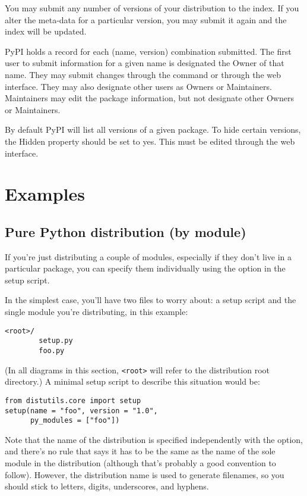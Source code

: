 \documentclass{howto}
\begin{document}
You may submit any number of versions of your distribution to the index. If
you alter the meta-data for a particular version, you may submit it again
and the index will be updated.

PyPI holds a record for each (name, version) combination submitted. The
first user to submit information for a given name is designated the Owner
of that name. They may submit changes through the 
command or through the web interface. They may also designate other users
as Owners or Maintainers. Maintainers may edit the package information, but
not designate other Owners or Maintainers.

By default PyPI will list all versions of a given package. To hide certain
versions, the Hidden property should be set to yes. This must be edited
through the web interface.



\section{Examples}
\label{examples}
  
\subsection{Pure Python distribution (by module)}
\label{pure-mod}

If you're just distributing a couple of modules, especially if they
don't live in a particular package, you can specify them individually
using the  option in the setup script.

In the simplest case, you'll have two files to worry about: a setup
script and the single module you're distributing,  in this
example:
\begin{verbatim}
<root>/
        setup.py
        foo.py
\end{verbatim}
(In all diagrams in this section, \verb|<root>| will refer to the
distribution root directory.)  A minimal setup script to describe this
situation would be:
\begin{verbatim}
from distutils.core import setup
setup(name = "foo", version = "1.0",
      py_modules = ["foo"])
\end{verbatim}
Note that the name of the distribution is specified independently with
the  option, and there's no rule that says it has to be the
same as the name of the sole module in the distribution (although that's
probably a good convention to follow).  However, the distribution name
is used to generate filenames, so you should stick to letters, digits,
underscores, and hyphens.
\end{document}
